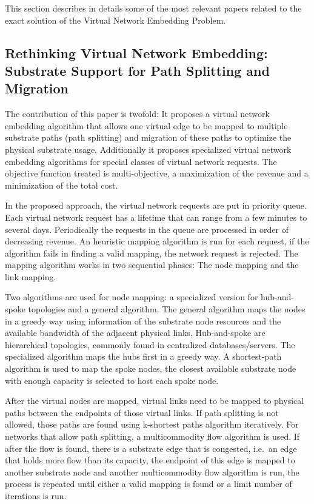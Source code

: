 This section describes in details some of the most relevant papers related to the exact solution of the Virtual Network Embedding Problem. 

\subsection{Rethinking Virtual Network Embedding: Substrate Support for Path Splitting and Migration \cite{Yu2008}}
The contribution of this paper is twofold: It proposes a virtual network embedding algorithm that allows one virtual edge to be mapped to multiple substrate paths (path splitting) and migration of these paths to optimize the physical substrate usage. Additionally it proposes specialized virtual network embedding algorithms for special classes of virtual network requests. The objective function treated is multi-objective, a maximization of the revenue and a minimization of the total cost.

In the proposed approach, the virtual network requests are put in priority queue. Each virtual network request has a lifetime that can range from a few minutes to several days. Periodically the requests in the queue are processed in order of decreasing revenue. An heuristic mapping algorithm is run for each request, if the algorithm fails in finding a valid mapping, the network request is rejected. The mapping algorithm works in two sequential phases: The node mapping and the link mapping.

Two algorithms are used for node mapping: a specialized version for hub-and-spoke topologies and a general algorithm. The general algorithm maps the nodes in a greedy way using information of the substrate node resources and the available bandwidth of the adjacent physical links. Hub-and-spoke are hierarchical topologies, commonly found in centralized databases/servers. The specialized algorithm maps the hubs first in a greedy way. A shortest-path algorithm is used to map the spoke nodes, the closest available substrate node with enough capacity is selected to host each spoke node.

After the virtual nodes are mapped, virtual links need to be mapped to physical paths between the endpoints of those virtual links. If path splitting is not allowed, those paths are found using k-shortest paths algorithm iteratively. For networks that allow path splitting, a multicommodity flow algorithm is used. If after the flow is found, there is a substrate edge that is congested, i.e.\ an edge that holds more flow than its capacity, the endpoint of this edge is mapped to another substrate node and another multicommodity flow algorithm is run, the process is repeated until either a valid mapping is found or a limit number of iterations is run.

